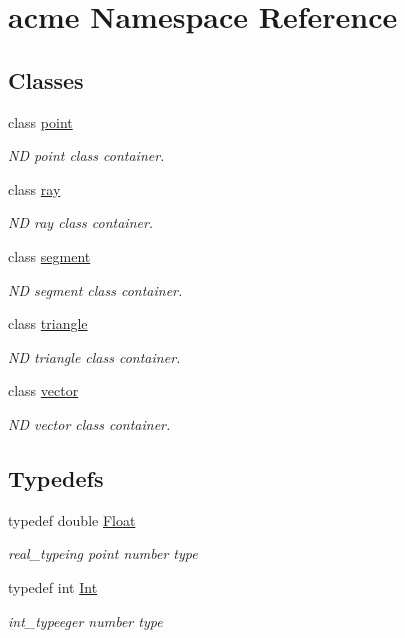 \hypertarget{namespaceacme}{}\section{acme Namespace Reference}
\label{namespaceacme}
\subsection*{Classes}
\begin{DoxyCompactItemize}
\item 
class \hyperlink{classacme_1_1point}{point}
\begin{DoxyCompactList}\small\item\em ND point class container. \end{DoxyCompactList}\item 
class \hyperlink{classacme_1_1ray}{ray}
\begin{DoxyCompactList}\small\item\em ND ray class container. \end{DoxyCompactList}\item 
class \hyperlink{classacme_1_1segment}{segment}
\begin{DoxyCompactList}\small\item\em ND segment class container. \end{DoxyCompactList}\item 
class \hyperlink{classacme_1_1triangle}{triangle}
\begin{DoxyCompactList}\small\item\em ND triangle class container. \end{DoxyCompactList}\item 
class \hyperlink{classacme_1_1vector}{vector}
\begin{DoxyCompactList}\small\item\em ND vector class container. \end{DoxyCompactList}\end{DoxyCompactItemize}
\subsection*{Typedefs}
\begin{DoxyCompactItemize}
\item 
\mbox{\label{namespaceacme_aebc1796778ad2c2ef830090c5738e56c}} 
typedef double \hyperlink{namespaceacme_aebc1796778ad2c2ef830090c5738e56c}{Float}
\begin{DoxyCompactList}\small\item\em real\+\_\+typeing point number type \end{DoxyCompactList}\item 
\mbox{\label{namespaceacme_a2ad7da80dca2640a79a37d38e2b14eb8}} 
typedef int \hyperlink{namespaceacme_a2ad7da80dca2640a79a37d38e2b14eb8}{Int}
\begin{DoxyCompactList}\small\item\em int\+\_\+typeeger number type \end{DoxyCompactList}\end{DoxyCompactItemize}
